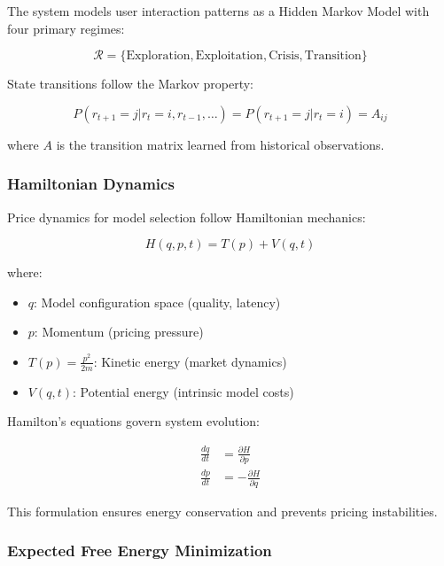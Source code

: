 \documentclass[11pt,twocolumn]{article}
\begin{document}
The system models user interaction patterns as a Hidden Markov Model with four primary regimes:

\begin{equation}
\mathcal{R} = \{\text{Exploration}, \text{Exploitation}, \text{Crisis}, \text{Transition}\}
\end{equation}

State transitions follow the Markov property:

\begin{equation}
P(r_{t+1} = j | r_t = i, r_{t-1}, \ldots) = P(r_{t+1} = j | r_t = i) = A_{ij}
\end{equation}

where $A$ is the transition matrix learned from historical observations.

\subsubsection{Hamiltonian Dynamics}

Price dynamics for model selection follow Hamiltonian mechanics:

\begin{equation}
H(q, p, t) = T(p) + V(q, t)
\end{equation}

where:
\begin{itemize}
\item $q$: Model configuration space (quality, latency)
\item $p$: Momentum (pricing pressure)
\item $T(p) = \frac{p^2}{2m}$: Kinetic energy (market dynamics)
\item $V(q,t)$: Potential energy (intrinsic model costs)
\end{itemize}

Hamilton's equations govern system evolution:

\begin{align}
\frac{dq}{dt} &= \frac{\partial H}{\partial p} \\
\frac{dp}{dt} &= -\frac{\partial H}{\partial q}
\end{align}

This formulation ensures energy conservation and prevents pricing instabilities.

\subsubsection{Expected Free Energy Minimization}
\end{document}
